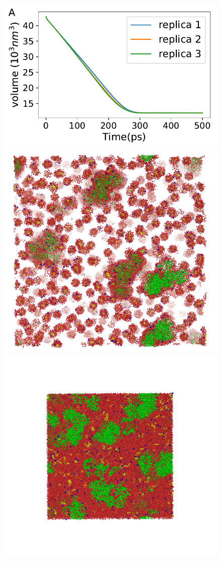 \documentclass[journal=jacsat,manuscript=article]{achemso}
\begin{document}
\begin{figure}[H]
\includegraphics[scale=0.5]{shrinking_volume.pdf} 
\includegraphics[scale=0.11]{box_big.png}
\includegraphics[scale=0.11]{box_small_.png}

\end{figure}
\end{document}
